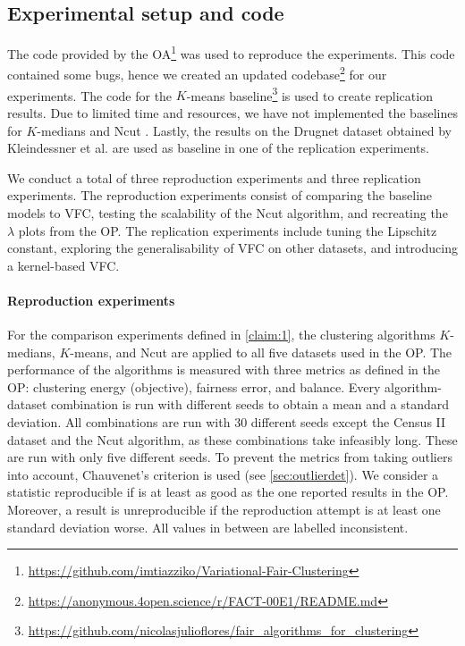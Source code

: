 \subsection{Experimental setup and code}
The code provided by the OA\footnote{\url{https://github.com/imtiazziko/Variational-Fair-Clustering}} was used to reproduce the experiments. This code contained some bugs, hence we created an updated codebase\footnote{\url{https://anonymous.4open.science/r/FACT-00E1/README.md}} for our experiments. The code for the $K$-means baseline\footnote{\label{bera_note}\url{https://github.com/nicolasjulioflores/fair_algorithms_for_clustering}} \citep{bera2019fair} is used to create replication results. Due to limited time and resources, we have not implemented the baselines for $K$-medians \citep{backurs2019scalable} and Ncut \citep{kleindessner2019guarantees}. Lastly, the results on the Drugnet dataset obtained by Kleindessner et al. are used as baseline in one of the replication experiments.


We conduct a total of three reproduction experiments and three replication experiments. The reproduction experiments consist of comparing the baseline models to VFC, testing the scalability of the Ncut algorithm, and recreating the $\lambda$ plots from the OP. The replication experiments include tuning the Lipschitz constant, exploring the generalisability of VFC on other datasets, and introducing a kernel-based VFC. 

\paragraph{Reproduction experiments}
For the comparison experiments defined in \ref{claim:1}, the clustering algorithms $K$-medians, $K$-means, and Ncut are applied to all five datasets used in the OP.
The performance of the algorithms is measured with three metrics as defined in the OP: clustering energy (objective), fairness error, and balance. Every algorithm-dataset combination is run with different seeds to obtain a mean and a standard deviation. All combinations are run with 30 different seeds except the Census II dataset and the Ncut algorithm, as these combinations take infeasibly long. These are run with only five different seeds. To prevent the metrics from taking outliers into account, Chauvenet's criterion \citep{lin2007cleaning} is used (see \autoref{sec:outlierdet}).
We consider a statistic reproducible if is at least as good as the one reported results in the OP. Moreover, a result is unreproducible if the reproduction attempt is at least one standard deviation worse. All values in between are labelled inconsistent.

